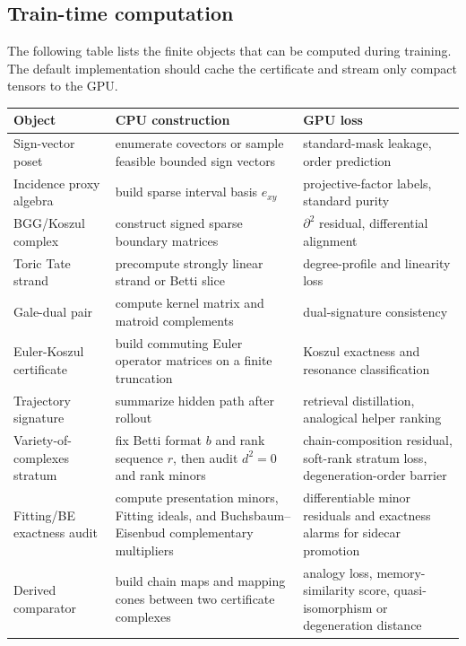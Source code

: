 \documentclass[11pt]{article}
\theoremstyle{definition}
\theoremstyle{plain}
\theoremstyle{remark}
\numberwithin{equation}{section}
\begin{document}
\subsection{Train-time computation}

The following table lists the finite objects that can be computed during training.  The default implementation should cache the certificate and stream only compact tensors to the GPU.

\begin{longtable}{p{}p{}p{}}
\toprule
Object & CPU construction & GPU loss \\
\midrule
Sign-vector poset & enumerate covectors or sample feasible bounded sign vectors & standard-mask leakage, order prediction \\
Incidence proxy algebra & build sparse interval basis $e_{xy}$ & projective-factor labels, standard purity \\
BGG/Koszul complex & construct signed sparse boundary matrices & $\partial^2$ residual, differential alignment \\
Toric Tate strand & precompute strongly linear strand or Betti slice & degree-profile and linearity loss \\
Gale-dual pair & compute kernel matrix and matroid complements & dual-signature consistency \\
Euler-Koszul certificate & build commuting Euler operator matrices on a finite truncation & Koszul exactness and resonance classification \\
Trajectory signature & summarize hidden path after rollout & retrieval distillation, analogical helper ranking \\
Variety-of-complexes stratum & fix Betti format $b$ and rank sequence $r$, then audit $d^2=0$ and rank minors & chain-composition residual, soft-rank stratum loss, degeneration-order barrier \\
Fitting/BE exactness audit & compute presentation minors, Fitting ideals, and Buchsbaum--Eisenbud complementary multipliers & differentiable minor residuals and exactness alarms for sidecar promotion \\
Derived comparator & build chain maps and mapping cones between two certificate complexes & analogy loss, memory-similarity score, quasi-isomorphism or degeneration distance \\
\bottomrule
\end{longtable}
\end{document}
